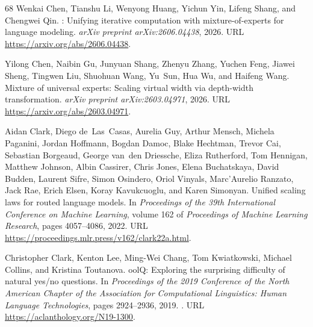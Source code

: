 \documentclass[]{bytedance_seed}
\theoremstyle{definition}
\theoremstyle{remark}
\begin{document}
\begin{thebibliography}{68}
Wenkai Chen, Tianshu Li, Wenyong Huang, Yichun Yin, Lifeng Shang, and Chengwei
  Qin.
: Unifying iterative computation with mixture-of-experts for
  language modeling.
\newblock \emph{arXiv preprint arXiv:2606.04438}, 2026{}.
\newblock URL \url{https://arxiv.org/abs/2606.04438}.

Yilong Chen, Naibin Gu, Junyuan Shang, Zhenyu Zhang, Yuchen Feng, Jiawei Sheng,
  Tingwen Liu, Shuohuan Wang, Yu~Sun, Hua Wu, and Haifeng Wang.
\newblock Mixture of universal experts: Scaling virtual width via depth-width
  transformation.
\newblock \emph{arXiv preprint arXiv:2603.04971}, 2026{}.
\newblock URL \url{https://arxiv.org/abs/2603.04971}.

Aidan Clark, Diego de~Las~Casas, Aurelia Guy, Arthur Mensch, Michela Paganini,
  Jordan Hoffmann, Bogdan Damoc, Blake Hechtman, Trevor Cai, Sebastian
  Borgeaud, George van~den Driessche, Eliza Rutherford, Tom Hennigan, Matthew
  Johnson, Albin Cassirer, Chris Jones, Elena Buchatskaya, David Budden,
  Laurent Sifre, Simon Osindero, Oriol Vinyals, Marc'Aurelio Ranzato, Jack Rae,
  Erich Elsen, Koray Kavukcuoglu, and Karen Simonyan.
\newblock Unified scaling laws for routed language models.
\newblock In \emph{Proceedings of the 39th International Conference on Machine
  Learning}, volume 162 of \emph{Proceedings of Machine Learning Research},
  pages 4057--4086, 2022.
\newblock URL \url{https://proceedings.mlr.press/v162/clark22a.html}.

Christopher Clark, Kenton Lee, Ming-Wei Chang, Tom Kwiatkowski, Michael
  Collins, and Kristina Toutanova.
ool{Q}: Exploring the surprising difficulty of natural yes/no
  questions.
\newblock In \emph{Proceedings of the 2019 Conference of the North American
  Chapter of the Association for Computational Linguistics: Human Language
  Technologies}, pages 2924--2936, 2019.
\newblock {}.
\newblock URL \url{https://aclanthology.org/N19-1300}.


\end{thebibliography}
\end{document}
